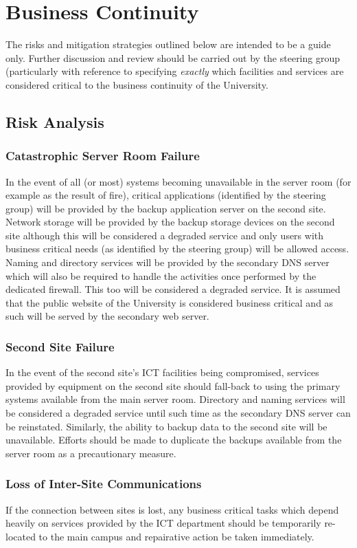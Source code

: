\documentclass[a4paper, twoside]{article}
\begin{document}
\section{Business Continuity}
The risks and mitigation strategies outlined below are intended to be a guide
only. Further discussion and review should be carried out by the steering group
(particularly with reference to specifying \emph{exactly} which facilities and
services are considered critical to the business continuity of the University.

\subsection{Risk Analysis}
\subsubsection{Catastrophic Server Room Failure}
In the event of all (or most) systems becoming unavailable in the server room
(for example as the result of fire), critical applications (identified by the
steering group) will be provided by the backup application server on the second
site. Network storage will be provided by the backup storage devices on the
second site although this will be considered a degraded service and only users
with business critical needs (as identified by the steering group) will be
allowed access. Naming and directory services will be provided by the secondary
DNS server which will also be required to handle the activities once performed
by the dedicated firewall. This too will be considered a degraded service. It is
assumed that the public website of the University is considered business
critical and as such will be served by the secondary web server.

\subsubsection{Second Site Failure}
In the event of the second site's ICT facilities being compromised, services
provided by equipment on the second site should fall-back to using the primary
systems available from the main server room. Directory and naming services will
be considered a degraded service until such time as the secondary DNS server can
be reinstated. Similarly, the ability to backup data to the second site will be
unavailable. Efforts should be made to duplicate the backups available from the
server room as a precautionary measure.

\subsubsection{Loss of Inter-Site Communications}
If the connection between sites is lost, any business critical tasks which
depend heavily on services provided by the ICT department should be temporarily
re-located to the main campus and repairative action be taken immediately.
\end{document}
